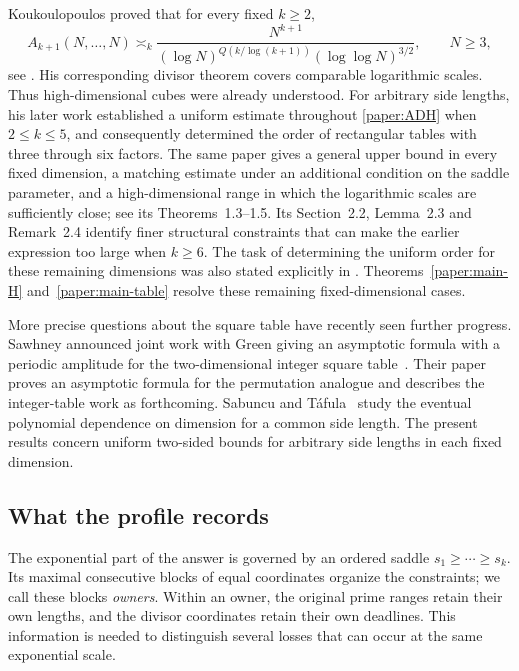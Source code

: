 Koukoulopoulos proved that for every fixed $k\geq2$,
\begin{equation}
 A_{k+1}(N,\ldots,N)\asymp_k
 \frac{N^{k+1}}
 {(\log N)^{Q(k/\log(k+1))}(\log\log N)^{3/2}},
 \qquad N\geq3,
 \label{paper:known-cube}
\end{equation}
see \cite[Corollary~1]{KoukLocal}. His corresponding divisor theorem
covers comparable logarithmic scales. Thus high-dimensional cubes were
already understood. For arbitrary side lengths, his later work
\cite{Kouk} established a uniform estimate throughout
\eqref{paper:ADH} when $2\leq k\leq5$, and consequently determined the
order of rectangular tables with three through six factors.
The same paper gives a general upper bound in every fixed dimension,
a matching estimate under an additional condition on the saddle
parameter, and a high-dimensional range in which the logarithmic scales
are sufficiently close; see its Theorems~1.3--1.5. Its
Section~2.2, Lemma~2.3 and Remark~2.4 identify finer structural
constraints that can make the earlier expression too large when
$k\geq6$. The task of determining the uniform order for these remaining
dimensions was also stated explicitly in
\cite[Chapter~6, pp.~87--88]{KoukThesis2010}.
Theorems~\ref{paper:main-H} and~\ref{paper:main-table} resolve these
remaining fixed-dimensional cases.

More precise questions about the square table have recently seen
further progress. Sawhney announced joint work with Green giving an
asymptotic formula with a periodic amplitude for the two-dimensional
integer square table~\cite{SawhneyGreenAnnouncement2025}. Their
paper~\cite[Theorem~1.1]{GreenSawhney2026} proves an asymptotic formula for the
permutation analogue and describes the integer-table work as
forthcoming. Sabuncu and T\'afula~\cite[Theorem~1.2]{SabuncuTafula2026}
study the eventual polynomial dependence on dimension for a common
side length. The present results concern uniform two-sided
bounds for arbitrary side lengths in each fixed dimension.

\subsection{What the profile records}

The exponential part of the answer is governed by an ordered saddle
$s_1\geq\cdots\geq s_k$. Its maximal consecutive blocks of equal
coordinates organize the constraints; we call these blocks
\emph{owners}. Within an owner, the original prime ranges retain their own lengths,
and the divisor coordinates retain their own deadlines.
This information is needed to distinguish several losses that can occur
at the same exponential scale.


